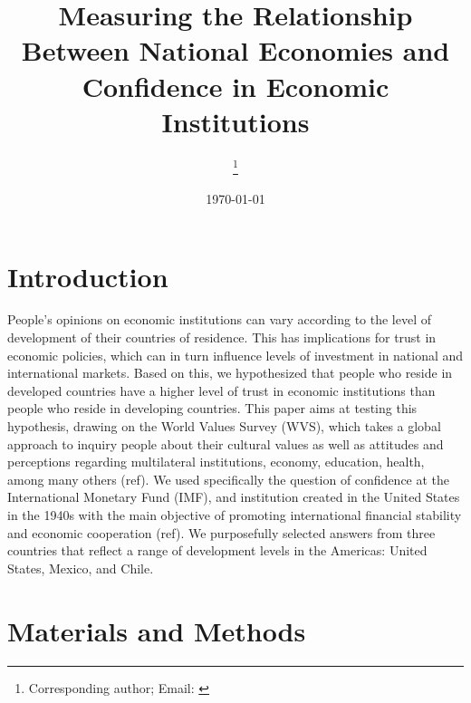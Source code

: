 \documentclass[12pt,halfline,a4paper,]{ouparticle}
\begin{document}
\title{Measuring the Relationship Between National Economies and Confidence in
Economic Institutions}

\author{%
\address{Department of Anthropology, University of Georgia}
\and
{}\address{Department of Political Science, University of Georgia}\thanks{Corresponding author; Email: \href{mailto:}{}}
}


\date{\today}


\maketitle



\hypertarget{introduction}{%
\section{Introduction}\label{introduction}}

People's opinions on economic institutions can vary according to the
level of development of their countries of residence. This has
implications for trust in economic policies, which can in turn influence
levels of investment in national and international markets. Based on
this, we hypothesized that people who reside in developed countries have
a higher level of trust in economic institutions than people who reside
in developing countries. This paper aims at testing this hypothesis,
drawing on the World Values Survey (WVS), which takes a global approach
to inquiry people about their cultural values as well as attitudes and
perceptions regarding multilateral institutions, economy, education,
health, among many others (ref). We used specifically the question of
confidence at the International Monetary Fund (IMF), and institution
created in the United States in the 1940s with the main objective of
promoting international financial stability and economic cooperation
(ref). We purposefully selected answers from three countries that
reflect a range of development levels in the Americas: United States,
Mexico, and Chile.

\hypertarget{materials-and-methods}{%
\section{Materials and Methods}\label{materials-and-methods}}
\end{document}
